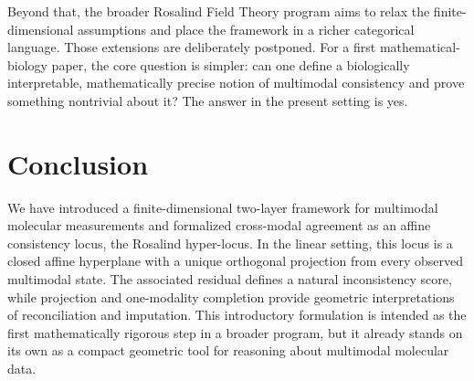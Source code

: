 \documentclass[11pt]{article}
\begin{document}
Beyond that, the broader Rosalind Field Theory program aims to relax the finite-dimensional assumptions and place the framework in a richer categorical language. Those extensions are deliberately postponed. For a first mathematical-biology paper, the core question is simpler: can one define a biologically interpretable, mathematically precise notion of multimodal consistency and prove something nontrivial about it? The answer in the present setting is yes.

\section{Conclusion}

We have introduced a finite-dimensional two-layer framework for multimodal molecular measurements and formalized cross-modal agreement as an affine consistency locus, the Rosalind hyper-locus. In the linear setting, this locus is a closed affine hyperplane with a unique orthogonal projection from every observed multimodal state. The associated residual defines a natural inconsistency score, while projection and one-modality completion provide geometric interpretations of reconciliation and imputation. This introductory formulation is intended as the first mathematically rigorous step in a broader program, but it already stands on its own as a compact geometric tool for reasoning about multimodal molecular data.
\end{document}
